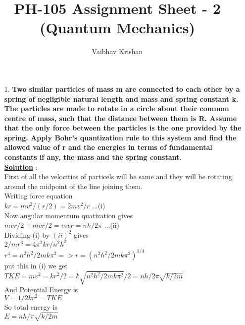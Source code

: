 \documentclass[10pt, a4paper]{article}
\begin{document}
	\title{PH-105 Assignment Sheet - 2 (Quantum Mechanics)}
	\date{}
	\author{Vaibhav Krishan}
	\maketitle
	\newcommand{\angstrom}{\mbox{\normalfont\AA}}
	\begin{enumerate}
		\item[1.] {\bf Two similar particles of mass m are connected to each other by a spring of
negligible natural length and mass and spring constant k. The particles are made to
rotate in a circle about their common centre of mass, such that the distance
between them is R. Assume that the only force between the particles is the one
provided by the spring. Apply Bohr’s quantization rule to this system and find the
allowed value of r and the energies in terms of fundamental constants if any, the
mass and the spring constant.}\\
		{\underline {\bf Solution}} :\\
		First of all the velocities of particels will be same and they will be rotating around the midpoint of the line joining them.\\
		Writing force equation\\
		\begin{math} kr = mv^2 / (r/2) = 2mv^2/r\end{math} ...(i)\\
		Now angular momentum quatization gives\\
		\begin{math} mvr/2 + mvr/2 = mvr = nh/2\pi\end{math} ...(ii)\\
		Dividing (i) by \begin{math} (ii)^2\end{math} gives\\
		\begin{math} 2/mr^3 = 4\pi^2kr/n^2h^2\end{math}\\
		\begin{math} r^4 = n^2h^2/2mk\pi^2 => r = (n^2h^2/2mk\pi^2)^{1/4}\end{math}\\
		put this in (i) we get\\
		\begin{math} TKE = mv^2 = kr^2 / 2 = k\sqrt{n^2h^2/2mk\pi^2} / 2 = nh/2\pi\sqrt{k/2m}\end{math}\\
		And Potential Energy is\\
		\begin{math} V = 1/2kr^2 = TKE\end{math}\\
		So total energy is\\
		\begin{math} E = nh/\pi\sqrt{k/2m}\end{math}\\
	\end{enumerate}
\end{document}
